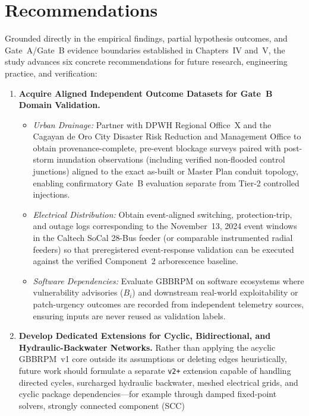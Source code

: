\section{Recommendations}\label{recommendations}

Grounded directly in the empirical findings, partial hypothesis
outcomes, and Gate~A/Gate~B evidence boundaries established in
Chapters~IV and~V, the study advances six concrete recommendations for
future research, engineering practice, and verification:

\begin{enumerate}[label=\arabic*.,leftmargin=*]
\item \textbf{Acquire Aligned Independent Outcome Datasets for Gate~B
Domain Validation.}
\begin{itemize}[leftmargin=*]
\item \emph{Urban Drainage:} Partner with DPWH Regional Office~X and
the Cagayan de Oro City Disaster Risk Reduction and Management Office
to obtain provenance-complete, pre-event blockage surveys paired with
post-storm inundation observations (including verified non-flooded
control junctions) aligned to the exact as-built or Master Plan
conduit topology, enabling confirmatory Gate~B evaluation separate from
Tier-2 controlled injections.
\item \emph{Electrical Distribution:} Obtain event-aligned switching,
protection-trip, and outage logs corresponding to the November~13, 2024
event windows in the Caltech SoCal 28-Bus feeder (or comparable
instrumented radial feeders) so that preregistered event-response
validation can be executed against the verified Component~2 arborescence
baseline.
\item \emph{Software Dependencies:} Evaluate GBBRPM on software
ecosystems where vulnerability advisories ($B_i$) and downstream
real-world exploitability or patch-urgency outcomes are recorded from
independent telemetry sources, ensuring inputs are never reused as
validation labels.
\end{itemize}
\item \textbf{Develop Dedicated Extensions for Cyclic, Bidirectional,
and Hydraulic-Backwater Networks.} Rather than applying the acyclic
GBBRPM~v1 core outside its assumptions or deleting edges heuristically,
future work should formulate a separate \texttt{v2+} extension capable
of handling directed cycles, surcharged hydraulic backwater, meshed
electrical grids, and cyclic package dependencies---for example through
damped fixed-point solvers, strongly connected component (SCC)

\end{enumerate}
